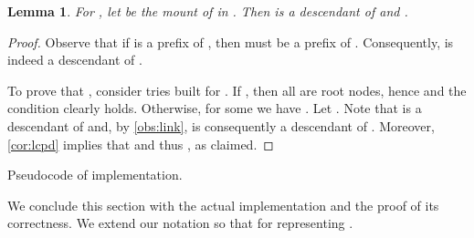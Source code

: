 \documentclass[a4paper]{article}
\newtheorem{lemma}[theorem]{Lemma}
\theoremstyle{remark}
\begin{document}
\begin{lemma}\label{lem:inscorr}
For , let  be the mount of  in .
Then  is a descendant of  and .
\end{lemma}
\begin{proof}
Observe that if  is a prefix of , then 
must be a prefix of . Consequently,  is indeed a descendant of .

To prove that , consider tries built for .
If , then all  are root nodes, hence 
and the condition clearly holds.
Otherwise, for some  we have  .
Let .
Note that  is a descendant of  and, by \cref{obs:link},  is consequently a descendant of .
Moreover, \cref{cor:lcpd} implies that 
and thus , as claimed.
\end{proof}

\begin{algorithm}
\begin{algorithmic}[1]
\Function{}{}
		\State 
		\State 
		\State 
	\label{alg:insert:for}	
		\If{}\label{alg:insert:if}
    \State 
		\State 
	\Else
    \State 
    \State 
	\EndIf
	\If{}
		\State 
		\If{}\; 
		\Else\; 
		\EndIf
	\EndIf
\EndFor
{}
	\State 
	\State 
	\State 
	\If {}
		\State 
		\State 
	\EndIf
\EndFor
\EndFunction
\end{algorithmic}
\caption{Pseudocode of  implementation.}\label{alg:insert}
\end{algorithm}

We conclude this section with the actual implementation
and the proof of its correctness.
We extend our notation so that 
for  representing .
\end{document}
